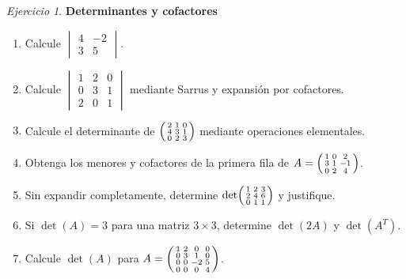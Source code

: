 \documentclass[12pt]{article}
\theoremstyle{remark}
\newtheorem{Ejer}[definicion]{Ejercicio}
\begin{document}
\begin{Ejer}
\textbf{Determinantes y cofactores}
\begin{enumerate}[start=17]
\item Calcule $\begin{vmatrix}4&-2\\3&5\end{vmatrix}$.
\item Calcule $\begin{vmatrix}1&2&0\\0&3&1\\2&0&1\end{vmatrix}$ mediante Sarrus y expansión por cofactores.
\item Calcule el determinante de $\begin{psmallmatrix}2&1&0\\4&3&1\\0&2&3\end{psmallmatrix}$ mediante operaciones elementales.
\item Obtenga los menores y cofactores de la primera fila de $A=\begin{psmallmatrix}1&0&2\\3&1&-1\\0&2&4\end{psmallmatrix}$.
\item Sin expandir completamente, determine $\det\begin{psmallmatrix}1&2&3\\2&4&6\\0&1&1\end{psmallmatrix}$ y justifique.
\item Si $\det(A)=3$ para una matriz $3\times3$, determine $\det(2A)$ y $\det(A^T)$.
\item Calcule $\det(A)$ para $A=\begin{psmallmatrix}1&2&0&0\\0&3&1&0\\0&0&-2&5\\0&0&0&4\end{psmallmatrix}$.
\end{enumerate}
\end{Ejer}
\end{document}
